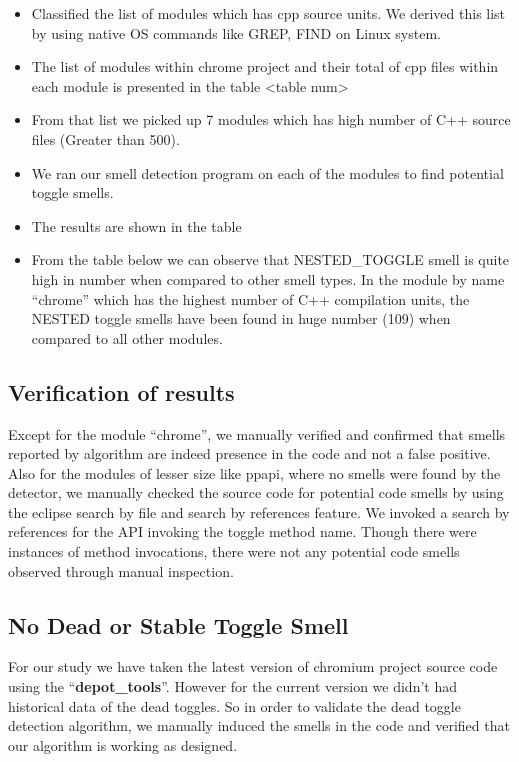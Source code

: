 \documentclass[conference]{IEEEtran}
\begin{document}
\begin{itemize}
\item Classified the list of modules which has cpp source units. We derived this list by using native OS commands like GREP, FIND on Linux system.
\item The list of modules within chrome project and their total of cpp files within each module is presented in the table <table num>
\item From that list we picked up 7 modules which has high number of C++ source files (Greater than 500).
\item We ran our smell detection program on each of the modules to find potential toggle smells.
\item The results are shown in the table
\item From the table below we can observe that NESTED\_TOGGLE smell is quite high in number when compared to other smell types. In the module by name “chrome” which has the highest number of C++ compilation units, the NESTED toggle smells have been found in huge number (109) when compared to all other modules.
\end{itemize}

\subsection{Verification of results}
\label{Result Varification}
Except for the module “chrome”, we manually verified and confirmed that smells reported by algorithm are indeed presence in the code and not a false positive. Also for the modules of lesser size like ppapi, where no smells were found by the detector, we manually checked the source code for potential code smells by using the eclipse search by file and search by references feature. We invoked a search by references for the API invoking the toggle method name. Though there were instances of method invocations, there were not any potential code smells observed through manual inspection.

\subsection{No Dead or Stable Toggle Smell}
For our study we have taken the latest version of chromium project source code using the ``\textbf{depot\_tools}''. However for the current version we didn’t had historical data of the dead toggles. So in order to validate the dead toggle detection algorithm, we manually induced the smells in the code and verified that our algorithm is working as designed.
\end{document}
